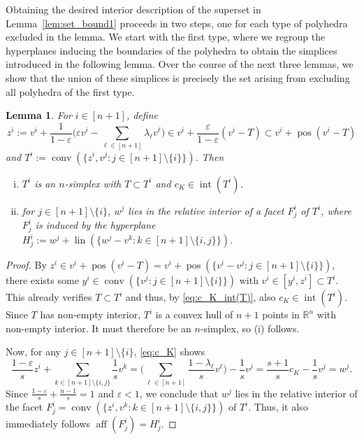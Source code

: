 \documentclass{amsart}
\newtheorem{lemma}[theorem]{Lemma}
\newcommand\R{\mathbb{R}}
\DeclareMathOperator{\conv}{conv}
\DeclareMathOperator{\pos}{pos}
\DeclareMathOperator{\aff}{aff}
\DeclareMathOperator{\lin}{lin}
\DeclareMathOperator{\inte}{int}
\begin{document}
Obtaining the desired interior description of the superset in Lemma~\ref{lem:set_bound1} proceeds in two steps,
one for each type of polyhedra excluded in the lemma.
We start with the first type, where we regroup the hyperplanes inducing the boundaries of the polyhedra to obtain the simplices introduced in the following lemma.
Over the course of the next three lemmas, we show that the union of these simplices is precisely the set arising from excluding all polyhedra of the first type.



\begin{lemma}\label{lem:spikes}
For $i \in [n+1]$, define
\begin{equation}\label{eq:z^i}
	z^i
	:= v^i + \frac{1}{1 - \varepsilon} \Bigg( \varepsilon v^i - \sum_{\ell \in [n+1]} \lambda_\ell v^\ell \Bigg)
	\in v^i + \frac{\varepsilon}{1 - \varepsilon} (v^i - T)
	\subset v^i + \pos(v^i - T)
\end{equation}
and $T^i := \conv(\{ z^i, v^j : j \in [n+1] \setminus \{i\} \})$.
Then
\begin{enumerate}[(i)]
\item $T^i$ is an $n$-simplex with $T \subset T^i$ and $c_K \in \inte(T^i)$.
\item for $j \in [n+1] \setminus \{i\}$, $w^j$ lies in the relative interior of a facet $F^i_j$ of $T^i$, where $F^i_j$ is induced by the hyperplane
$H^i_j := w^j + \lin(\{ w^j-v^k : k \in [n+1] \setminus \{i,j\} \})$.
\end{enumerate}
\end{lemma}
\begin{proof}
By $z^i \in v^i + \pos(v^i - T) = v^i + \pos(\{ v^i - v^j : j \in [n+1] \setminus \{i\} \})$,
there exists some $y^i \in \conv(\{ v^j : j \in [n+1] \setminus \{i\} \})$ with $v^i \in [y^i,z^i] \subset T^i$.
This already verifies $T \subset T^i$ and thus, by \eqref{eq:c_K_int(T)}, also $c_K \in \inte(T^i)$.
Since $T$ has non-empty interior, $T^i$ is a convex hull of $n+1$ points in $\R^n$ with non-empty interior.
It must therefore be an $n$-simplex, so (i) follows.

Now, for any $j \in [n+1] \setminus \{i\}$,
\eqref{eq:c_K} shows
\[
	\frac{1 - \varepsilon}{s} z^i + \sum_{k \in [n+1] \setminus \{i,j\}} \frac{1}{s} v^k
	= \Bigg( \sum_{\ell \in [n+1]} \frac{1 - \lambda_\ell}{s} v^\ell \Bigg) - \frac{1}{s} v^j
	= \frac{s+1}{s} c_K - \frac{1}{s} v^j
	= w^j.
\]
Since $\frac{1 - \varepsilon}{s} + \frac{n-1}{s} = 1$ and $\varepsilon < 1$,
we conclude that $w^j$ lies in the relative interior of the facet
$F^i_j = \conv(\{ z^i, v^k : k \in [n+1] \setminus \{i,j\} \})$ of $T^i$.
Thus, it also immediately follows $\aff(F^i_j) = H^i_j$.
\end{proof}
\end{document}
